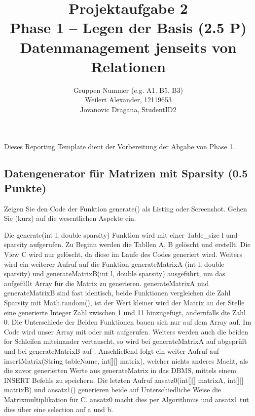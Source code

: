 \documentclass[11pt]{scrartcl}
\title{
  \textbf{\large Projektaufgabe 2 } \\
  Phase 1 – Legen der Basis (2.5 P) \\
  {\large Datenmanagement jenseits von Relationen}
}
\author{
  Gruppen Nummer (e.g. A1, B5, B3) \\
  \large Weilert Alexander, 12119653 \\
  \large Jovanovic Dragana, StudentID2
}
\begin{document}
\maketitle\thispagestyle{empty}

Dieses Reporting Template dient der Vorbereitung der Abgabe von Phase 1.

\subsection*{Datengenerator für Matrizen mit Sparsity (0.5 Punkte)}

Zeigen Sie den Code der Funktion generate() als Listing oder Screenshot.
Gehen Sie (kurz) auf die wesentlichen Aspekte ein.

Die generate(int l, double sparsity) Funktion wird mit einer Table_size l und sparsity aufgerufen. 
Zu Beginn werden die Tabllen A, B gelöscht und erstellt. Die View C wird nur gelöscht, da diese im Laufe des Codes generiert wird.
Weiters wird ein weiterer Aufruf auf die Funktion generateMatrixA (int l, double sparsity) und generateMatrixB(int l, double sparsity) ausgeführt, um das aufgefüllt Array für die Matrix zu generieren. 
generateMatrixA und generateMatrixB sind fast identisch, beide Funktionen vergleichen die Zahl Sparsity mit Math.random(),  ist der Wert kleiner wird der Matrix an der Stelle eine generierte Integer Zahl zwischen 1 und 11 hinzugefügt, andernfalls die Zahl 0.  
Die Unterschiede der Beiden Funktionen bauen sich nur auf dem Array auf. 
Im Code wird unser Array mit  oder mit  aufgerufen. Weiters werden auch die beiden for Schleifen miteinander vertauscht, so wird bei generateMatrixA auf  abgeprüft und bei generateMatrixB auf .
Anschließend folgt ein weiter Aufruf auf insertMatrix(String tableName, int[][] matrix), welcher nichts anderes Macht, als die zuvor generierten Werte aus generateMatrix in das DBMS, mittels einem INSERT Befehls zu speichern.
Die letzten Aufruf ansatz0(int[][] matrixA, int[][] matrixB) und ansatz1() generieren beide auf Unterschiedliche Weise die Matrixmultiplikation für C. 
ansatz0 macht dies per Algorithmus und ansatz1 tut dies über eine selection auf a und b. 
\end{document}
